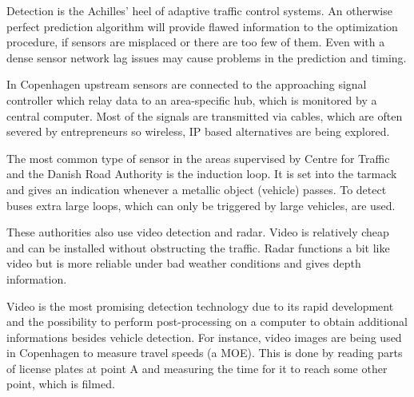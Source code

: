 \label{detection}
Detection is the Achilles' heel of adaptive traffic control systems. An otherwise perfect prediction algorithm will provide flawed information to the optimization procedure, if sensors are misplaced or there are too few of them. Even with a dense sensor network lag issues may cause problems in the prediction and timing.

In Copenhagen upstream sensors are connected to the approaching signal controller which relay data to an area-specific hub, which is monitored by a central computer. Most of the signals are transmitted via cables, which are often severed by entrepreneurs so wireless, IP based alternatives are being explored.

The most common type of sensor in the areas supervised by Centre for Traffic and the Danish Road Authority is the induction loop. It is set into the tarmack and gives an indication whenever a metallic object (vehicle) passes. To detect buses extra large loops, which can only be triggered by large vehicles, are used. 

These authorities also use video detection and radar. Video is relatively cheap and can be installed without obstructing the traffic. Radar functions a bit like video but is more reliable under bad weather conditions and gives depth information.

Video is the most promising detection technology due to its rapid development and the possibility to perform post-processing on a computer to obtain additional informations besides vehicle detection. For instance, video images are being used in Copenhagen to measure travel speeds (a MOE). This is done by reading parts of license plates at point A and measuring the time for it to reach some other point, which is filmed.